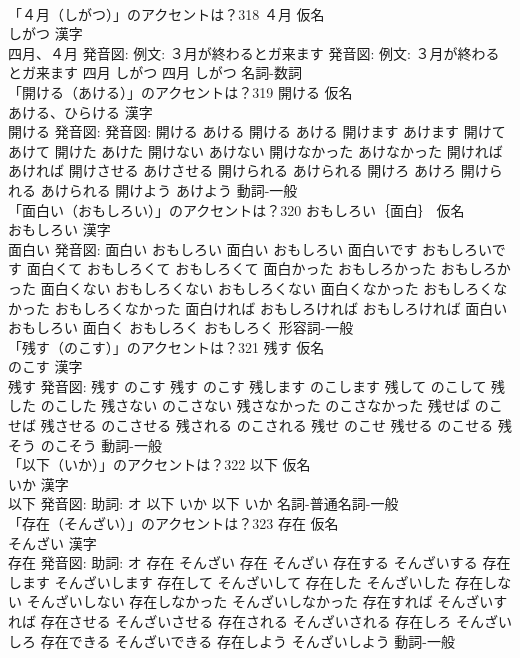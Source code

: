 \documentclass[8pt]{extreport}
\begin{document}
\begin{CJK}{UTF8}{min}
\\	「４月（しがつ）」のアクセントは？318	４月 仮名　
\\	しがつ 漢字　
\\	四月、４月 発音図: 例文: ３月が終わるとガ来ます 発音図: 例文: ３月が終わるとガ来ます	四月 しがつ		四月 しがつ				名詞-数詞 
\\	「開ける（あける）」のアクセントは？319	開ける 仮名　
\\	あける、ひらける 漢字　
\\	開ける 発音図: 発音図:	開ける あける		開ける あける 開けます あけます 開けて あけて 開けた あけた 開けない あけない 開けなかった あけなかった 開ければ あければ 開けさせる あけさせる 開けられる あけられる 開けろ あけろ 開けられる あけられる 開けよう あけよう				動詞-一般 
\\	「面白い（おもしろい）」のアクセントは？320	おもしろい｛面白｝ 仮名　
\\	おもしろい 漢字　
\\	面白い 発音図:	面白い おもしろい		面白い おもしろい 面白いです おもしろいです 面白くて おもしろくて おもしろくて 面白かった おもしろかった おもしろかった 面白くない おもしろくない おもしろくない 面白くなかった おもしろくなかった おもしろくなかった 面白ければ おもしろければ おもしろければ 面白い おもしろい 面白く おもしろく おもしろく				形容詞-一般 
\\	「残す（のこす）」のアクセントは？321	残す 仮名　
\\	のこす 漢字　
\\	残す 発音図:	残す のこす		残す のこす 残します のこします 残して のこして 残した のこした 残さない のこさない 残さなかった のこさなかった 残せば のこせば 残させる のこさせる 残される のこされる 残せ のこせ 残せる のこせる 残そう のこそう				動詞-一般 
\\	「以下（いか）」のアクセントは？322	以下 仮名　
\\	いか 漢字　
\\	以下 発音図: 助詞: オ	以下 いか		以下 いか				名詞-普通名詞-一般 
\\	「存在（そんざい）」のアクセントは？323	存在 仮名　
\\	そんざい 漢字　
\\	存在 発音図: 助詞: オ	存在 そんざい		存在 そんざい 存在する そんざいする 存在します そんざいします 存在して そんざいして 存在した そんざいした 存在しない そんざいしない 存在しなかった そんざいしなかった 存在すれば そんざいすれば 存在させる そんざいさせる 存在される そんざいされる 存在しろ そんざいしろ 存在できる そんざいできる 存在しよう そんざいしよう				動詞-一般 

\end{CJK}
\end{document}
